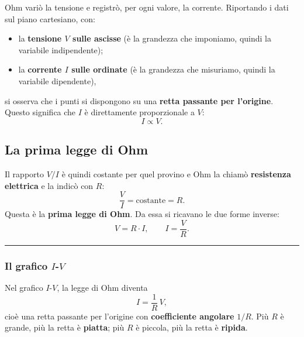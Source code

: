 Ohm variò la tensione e registrò, per ogni valore, la corrente. Riportando i dati sul piano cartesiano, con:
\begin{itemize}[leftmargin=1cm]
  \item la \textbf{tensione \(V\) sulle ascisse} (è la grandezza che imponiamo, quindi la variabile indipendente);
  \item la \textbf{corrente \(I\) sulle ordinate} (è la grandezza che misuriamo, quindi la variabile dipendente),
\end{itemize}
si osserva che i punti si dispongono su una \textbf{retta passante per l'origine}. Questo significa che \(I\) è direttamente proporzionale a \(V\):
\[
I \propto V.
\]



\subsection{La prima legge di Ohm}
Il rapporto \(V/I\) è quindi costante per quel provino e Ohm la chiamò \textbf{resistenza elettrica} e la indicò con \(R\):
\[
\frac{V}{I} = \text{costante} = R.
\]
Questa è la \textbf{prima legge di Ohm}. Da essa si ricavano le due forme inverse:
\[
V = R \cdot I, \qquad I = \frac{V}{R}.
\]

\hrule
\subsubsection{Il grafico \(I\)-\(V\)}

\noindent
\begin{minipage}[t]{0.52\textwidth}
\vspace{0pt}
Nel grafico \(I\)-\(V\), la legge di Ohm diventa
\[
I = \frac{1}{R}\,V,
\]
cioè una retta passante per l'origine con \textbf{coefficiente angolare} \(1/R\). Più \(R\) è grande, più la retta è \textbf{piatta}; più \(R\) è piccola, più la retta è \textbf{ripida}.
\end{minipage}%
\hfill
\begin{minipage}[t]{0.45\textwidth}
\vspace{0pt}
\centering
{}
\end{minipage}

